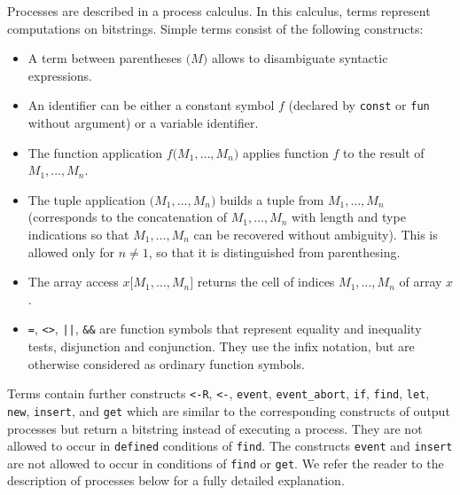 Processes are described in a process calculus.
In this calculus, terms represent computations on bitstrings. 
Simple terms consist
of the following constructs:
\begin{itemize}

\item A term between parentheses $\texttt{(}M\texttt{)}$
allows to disambiguate syntactic expressions.

\item An identifier can be either a constant symbol $f$
(declared by \texttt{const} or \texttt{fun} without argument)
or a variable identifier.

\item The function application $f\texttt{(}M_1, \ldots, M_n\texttt{)}$
applies function $f$ to the result of $M_1, \ldots, M_n$.

\item The tuple application $\texttt{(}M_1, \ldots, M_n\texttt{)}$
builds a tuple from $M_1, \ldots, M_n$ (corresponds to the concatenation
of $M_1, \ldots, M_n$ with length and type indications so that 
$M_1, \ldots, M_n$ can be recovered without ambiguity).
This is allowed only for $n \neq 1$, so that it is distinguished
from parenthesing.

\item The array access $x\texttt{[}M_1, \ldots, M_n\texttt{]}$
returns the cell of indices $M_1, \ldots, M_n$ of array $x$.

\item \texttt{=}, \texttt{<>}, \texttt{||}, \texttt{\&\&}
are function symbols that represent equality and inequality tests, 
disjunction and conjunction. They use the infix notation, but
are otherwise considered as ordinary function symbols.

\end{itemize}
Terms contain further constructs \texttt{<-R}, \texttt{<-}, \texttt{event}, \texttt{event\string_abort}, \texttt{if}, \texttt{find},
\texttt{let}, \texttt{new}, \texttt{insert}, and \texttt{get} which are similar to the corresponding
constructs of output processes but return a bitstring instead of
executing a process. 
They are not allowed to occur in \texttt{defined} conditions of \texttt{find}.
The constructs \texttt{event} and \texttt{insert} are not allowed to 
occur in conditions of \texttt{find} or {\tt get}.
We refer the reader to the description of 
processes below for a fully detailed explanation.
